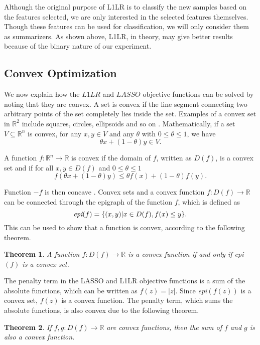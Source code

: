 \documentclass{article}
\newtheorem{Theorem}{Theorem}
\begin{document}
Although the original purpose of L1LR is to classify the new samples based on the features selected, we are only interested in the selected features themselves. Though these features can be used for classification, we will only consider them as summarizers. As shown above, L1LR, in theory, may give better results because of the binary nature of our experiment.

\subsection{Convex Optimization}
We now explain how the $L1LR$ and $LASSO$ objective functions can be solved by noting that they are convex. A set is convex if the line segment connecting two arbitrary points of the set completely lies inside the set. Examples of a convex set in $\mathbb{R}^2$ include squares, circles, ellipsoids and so on \cite{linear}. Mathematically, if a set $V \subseteq \mathbb{R}^n$ is convex, for any $x,y \in V$ and any $\theta$ with $0 \leq \theta \leq 1$, we have
$$\theta x+(1-\theta)y \in V.$$

A function $f: \mathbb{R}^n \rightarrow \mathbb{R}$ is convex if the domain of $f$, written as $D(f)$, is a convex set and if for all $x,y \in D(f)$ and $0 \leq \theta \leq 1$
$$f(\theta x+(1-\theta)y)\leq \theta f(x)+(1-\theta) f(y).$$

Function $-f$ is then concave \cite{convex}. Convex sets and a convex function $f: D(f) \rightarrow \mathbb{R}$ can be connected through the epigraph of the function $f$, which is defined as 
$$\emph{epi}(f)=\{(x,y)|x \in D(f), f(x) \leq y\}.$$ 
This can be used to show that a function is convex, according to the following theorem.

\vspace*{\baselineskip}
\begin{Theorem}\label{thm:1}
A function $f: D(f) \rightarrow \mathbb{R}$ is a convex function if and only if \emph{epi}$(f)$ is a convex set.
\end{Theorem}

The penalty term in the LASSO and L1LR objective functions is a sum of the absolute functions, which can be written as $f(z)=|z|$. Since \emph{epi}$(f(z))$ is a convex set, $f(z)$ is a convex function. The penalty term, which sums the absolute functions, is also convex due to the following theorem.

\vspace*{\baselineskip}
\begin{Theorem}\label{thm:2}
If $f,g: D(f) \rightarrow \mathbb{R}$ are convex functions, then the sum of $f$ and $g$ is also a convex function. 
\end{Theorem}
\end{document}
